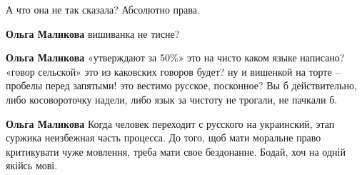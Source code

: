  
 
 
 
 

 
А что она не так сказала?
Абсолютно права.

\begin{itemize} %
 
\textbf{Ольга Маликова} вишиванка не тисне?

 
\textbf{Ольга Маликова} «утверждают за 50\%» это на чисто каком языке написано?
«говор сельской» это из каковских говоров будет? ну и вишенкой на торте –
пробелы перед запятыми! это вестимо русское, посконное? Вы б действительно,
либо косовороточку надели, либо язык за чистоту не трогали, не пачкали б.

 
\textbf{Ольга Маликова} Когда человек переходит с русского на украинский, этап суржика неизбежная часть процесса.
До того, щоб мати моральне право критикувати чуже мовлення, треба мати свое бездонанне. Бодай, хоч на одній якійсь мові.
\end{itemize} %

